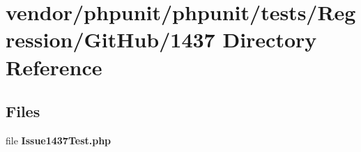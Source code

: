 \section{vendor/phpunit/phpunit/tests/\+Regression/\+Git\+Hub/1437 Directory Reference}
\label{dir_909f98a3398aa752440edffabb82d082}
\subsection*{Files}
\begin{DoxyCompactItemize}
\item 
file {\bf Issue1437\+Test.\+php}
\end{DoxyCompactItemize}
